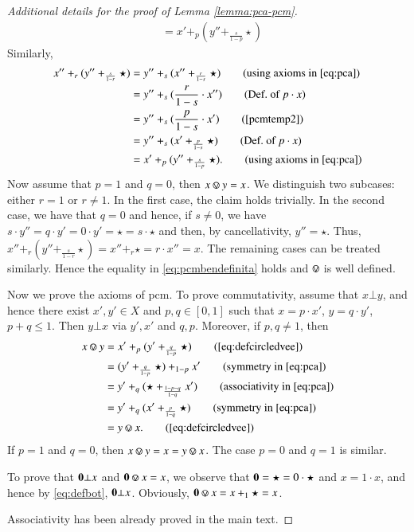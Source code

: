 \begin{proof}[Additional details for the proof of Lemma \ref{lemma:pca-pcm}]
\begin{align*}
    & = x'+_p(y''+_{\frac{s}{1-p}}\star) \tag{Def.\ of $p\cdot x$}
    \end{align*}
    Similarly,
    \begin{align*}
 x''+_r(y''+_{\frac{s}{1-r}}\star) & = y''+_s (x''+_{\frac{r}{1-s}}\star) \tag{using axioms in \ref{eq:pca}}\\
    & = y''+_s(\frac{r}{1-s}\cdot x'') \tag{Def.\ of $p\cdot x$}\\
    & = y''+_s(\frac{p}{1-s}\cdot x') \tag{\ref{pcmtemp2}}\\
    & = y''+_s(x'+_{\frac{p}{1-s}}\star) \tag{Def.\ of $p\cdot x$}\\
    & = x'+_p(y''+_{\frac{s}{1-p}}\star ). \tag{using axioms in \ref{eq:pca}}
\end{align*}
Now assume that $p=1$ and $q=0$, then $x\circledvee y = x$. We distinguish two subcases: either $r=1$ or $r\not=1$. In the first case, the claim holds trivially. In the second case, we have that $q=0$ and hence, if $s\not= 0$, we have $s\cdot y''= q\cdot y'= 0 \cdot y' = \star = s\cdot \star$ and then, by cancellativity, $y''=\star$. Thus, $x''+_r(y''+_{\frac{s}{1-r}}\star) = x''+_r \star = r\cdot x'' = x$. The remaining cases can be treated similarly. Hence the equality in \eqref{eq:pcmbendefinita} holds and $\circledvee$ is well defined.


Now we prove the axioms of pcm. To prove commutativity, assume that $x\bot y$, and hence there exist $x',y'\in X$ and $p,q\in [0,1]$ such that $x=p\cdot x'$, $y=q\cdot y'$, $p+q\leq 1$. Then $y\bot x$ via $y',x'$ and $q,p$. 
Moreover, if $p,q\not=1$, then
\begin{align*}
    x\circledvee y & = x'+_p(y'+_{\frac{q}{1-p}}\star) \tag{\eqref{eq:defcircledvee}}\\
    & = (y'+_{\frac{q}{1-p}}\star) +_{1-p} x' \tag{symmetry in \eqref{eq:pca}}\\
    & = y'+_q(\star +_{\frac{1-p-q}{1-q}} x') \tag{associativity in \eqref{eq:pca}}\\
    & = y'+_q(x'+_{\frac{p}{1-q}}\star) \tag{symmetry in \eqref{eq:pca}}\\
& = y\circledvee x. \tag{\eqref{eq:defcircledvee}}
\end{align*}
If $p=1$ and $q=0$, then $x\circledvee y = x = y\circledvee x$. The case $p=0$ and $q=1$ is similar.


To prove that $\mathbf{0} \bot x$ and $\zeropcm \circledvee x =x$, we observe that $\mathbf{0}=\star = 0\cdot \star$ and $x=1\cdot x$, and hence by \eqref{eq:defbot}, $\mathbf{0} \bot x$. Obviously, $\zeropcm \circledvee x = x +_1 \star = x$. 

Associativity has been already proved in the main text.
\end{proof}